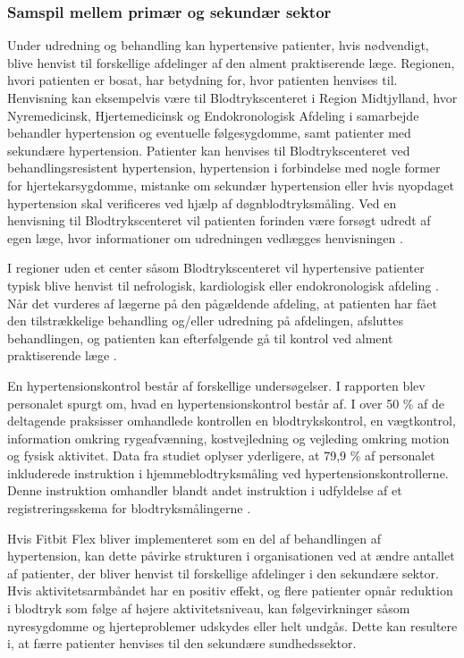 \subsubsection{Samspil mellem primær og sekundær sektor}
Under udredning og behandling kan hypertensive patienter, hvis nødvendigt, blive henvist til forskellige afdelinger af den alment praktiserende læge. Regionen, hvori patienten er bosat, har betydning for, hvor patienten henvises til. Henvisning kan eksempelvis være til Blodtrykscenteret i Region Midtjylland, hvor Nyremedicinsk, Hjertemedicinsk og Endokronologisk Afdeling i samarbejde behandler hypertension og eventuelle følgesygdomme, samt patienter med sekundære hypertension. Patienter kan henvises til Blodtrykscenteret ved behandlingsresistent hypertension, hypertension i forbindelse med nogle former for hjertekarsygdomme, mistanke om sekundær hypertension eller hvis nyopdaget hypertension skal verificeres ved hjælp af døgnblodtryksmåling. Ved en henvisning til Blodtrykscenteret vil patienten forinden være forsøgt udredt af egen læge, hvor informationer om udredningen vedlægges henvisningen \citep{aarhusuniversitetshospital}. 

I regioner uden et center såsom Blodtrykscenteret vil hypertensive patienter typisk blive henvist til nefrologisk, kardiologisk eller endokronologisk afdeling \citep{buur2011}. Når det vurderes af lægerne på den pågældende afdeling, at patienten har fået den tilstrækkelige behandling og/eller udredning på afdelingen, afsluttes behandlingen, og patienten kan efterfølgende gå til kontrol ved alment praktiserende læge \citep{sundhedsstyrelsen2010, lodberg2016}.

En hypertensionskontrol består af forskellige  undersøgelser. I rapporten  blev personalet spurgt om, hvad en  hypertensionskontrol består af. I over 50 \% af de deltagende praksisser omhandlede kontrollen en blodtrykskontrol, en vægtkontrol, information omkring rygeafvænning, kostvejledning og vejleding omkring motion og fysisk aktivitet. Data fra studiet oplyser yderligere, at 79,9 \% af personalet inkluderede instruktion i hjemmeblodtryksmåling ved hypertensionskontrollerne. Denne instruktion omhandler blandt andet instruktion i udfyldelse af et registreringsskema for blodtryksmålingerne \citep{munck2007}. 

Hvis Fitbit Flex bliver implementeret som en del af behandlingen af hypertension, kan dette påvirke strukturen i organisationen ved at ændre antallet af patienter, der bliver henvist til forskellige afdelinger i den sekundære sektor. Hvis aktivitetsarmbåndet har en positiv effekt, og flere patienter opnår reduktion i blodtryk som følge af højere aktivitetsniveau, kan følgevirkninger såsom nyresygdomme og hjerteproblemer udskydes eller helt undgås. Dette kan resultere i, at færre patienter henvises til den sekundære sundhedssektor. 

